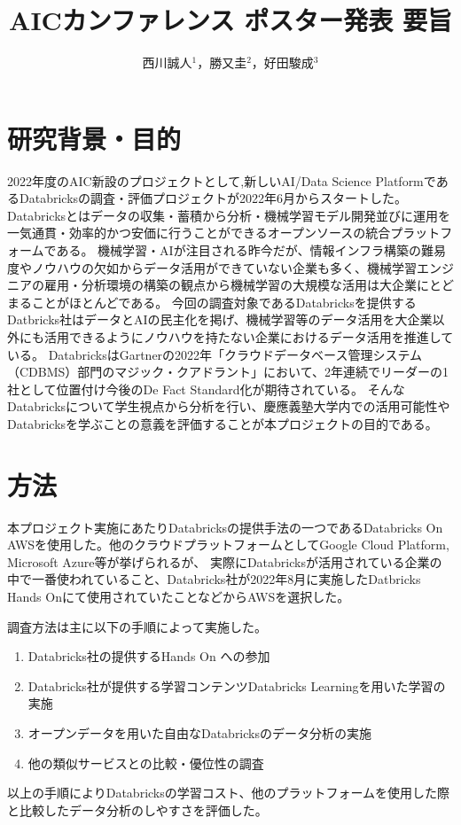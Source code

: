 \documentclass[twocolumn]{jsarticle}
\title{AICカンファレンス ポスター発表 要旨}
\author{西川誠人$^1$，勝又圭$^2$，好田駿成$^3$}
\begin{document}
\maketitle
\section{研究背景・目的}
2022年度のAIC新設のプロジェクトとして,新しいAI/Data Science PlatformであるDatabricksの調査・評価プロジェクトが2022年6月からスタートした。
Databricksとはデータの収集・蓄積から分析・機械学習モデル開発並びに運用を一気通貫・効率的かつ安価に行うことができるオープンソースの統合プラットフォーム\cite{databricksHP}である。
機械学習・AIが注目される昨今だが、情報インフラ構築の難易度やノウハウの欠如からデータ活用ができていない企業も多く、機械学習エンジニアの雇用・分析環境の構築の観点から機械学習の大規模な活用は大企業にとどまることがほとんどである。
今回の調査対象であるDatabricksを提供するDatbricks社はデータとAIの民主化を掲げ、機械学習等のデータ活用を大企業以外にも活用できるようにノウハウを持たない企業におけるデータ活用を推進している。
DatabricksはGartnerの2022年「クラウドデータベース管理システム（CDBMS）部門のマジック・クアドラント」において、2年連続でリーダーの1社\cite{Gartner}として位置付け今後のDe Fact Standard化が期待されている。
そんなDatabricksについて学生視点から分析を行い、慶應義塾大学内での活用可能性やDatabricksを学ぶことの意義を評価することが本プロジェクトの目的である。
\section{方法}
本プロジェクト実施にあたりDatabricksの提供手法の一つであるDatabricks On AWSを使用した。他のクラウドプラットフォームとしてGoogle Cloud Platform, Microsoft Azure等が挙げられるが、
実際にDatabricksが活用されている企業の中で一番使われていること、Databricks社が2022年8月に実施したDatbricks Hands Onにて使用されていたことなどからAWSを選択した。\par 
調査方法は主に以下の手順によって実施した。
\begin{enumerate}
  \item Databricks社の提供するHands On への参加
  \item Databricks社が提供する学習コンテンツDatabricks Learningを用いた学習の実施
  \item オープンデータを用いた自由なDatabricksのデータ分析の実施
  \item 他の類似サービスとの比較・優位性の調査
\end{enumerate}
以上の手順によりDatabricksの学習コスト、他のプラットフォームを使用した際と比較したデータ分析のしやすさを評価した。
\vspace{-6zh}
\end{document}
